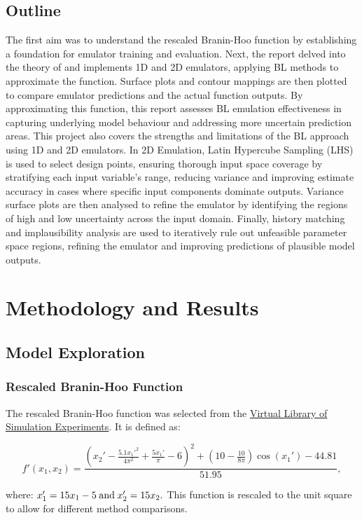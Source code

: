 \documentclass[12pt]{report} %
\begin{document}
\section{Outline}
The first aim was to understand the rescaled Branin-Hoo function by establishing a foundation for emulator training and evaluation. Next, the report delved into the theory of and implements 1D and 2D emulators, applying BL methods to approximate the function. Surface plots and contour mappings are then plotted to compare emulator predictions and the actual function outputs. By approximating this function, this report assesses BL emulation effectiveness in capturing underlying model behaviour and addressing more uncertain prediction areas. This project also covers the strengths and limitations of the BL approach using 1D and 2D emulators. In 2D Emulation, Latin Hypercube Sampling (LHS) is used to select design points, ensuring thorough input space coverage by stratifying each input variable's range, reducing variance and improving estimate accuracy in cases where specific input components dominate outputs.\cite{mckay1979lhs} Variance surface plots are then analysed to refine the emulator by identifying the regions of high and low uncertainty across the input domain. Finally, history matching and implausibility analysis are used to iteratively rule out unfeasible parameter space regions, refining the emulator and improving predictions of plausible model outputs.\cite{Iskauskas2024}


\chapter{Methodology and Results}
\section{Model Exploration}
\subsection{Rescaled Branin-Hoo Function}
The rescaled Branin-Hoo function was selected from the \href{https://www.sfu.ca/~ssurjano/branin.html}{Virtual Library of Simulation Experiments}. It is defined as:

\[
f'(x_1, x_2) = \frac{\left( x_2' - \frac{5.1 {x_1'}^2}{4 \pi^2} + \frac{5 x_1'}{\pi} - 6 \right)^2 + \left( 10 - \frac{10}{8\pi} \right) \cos(x_1') - 44.81}{51.95},
\]

\noindent where: $x_1' = 15x_1 - 5 \hspace{0.25em} \text{and} \hspace{0.25em} x_2' = 15x_2.$ This function is rescaled to the unit square to allow for different method comparisons.
\end{document}

